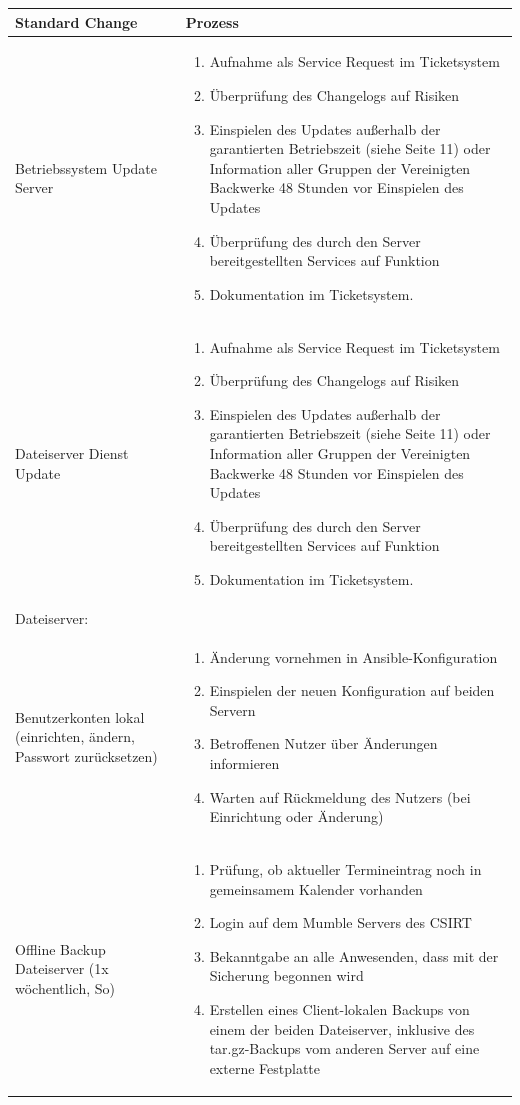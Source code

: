 \documentclass[]{article}
\begin{document}
\begin{longtable}{|p{3cm}|p{10cm}|}
\toprule
Standard Change & Prozess\tabularnewline
\midrule
Betriebssystem Update Server & \begin{enumerate}
\item
  Aufnahme als Service Request im Ticketsystem
\item
  Überprüfung des Changelogs auf Risiken
\item
  Einspielen des Updates außerhalb der garantierten Betriebszeit (siehe Seite
  11) oder Information aller Gruppen der Vereinigten Backwerke 48 Stunden vor
  Einspielen des Updates
\item
  Überprüfung des durch den Server bereitgestellten Services auf
  Funktion
\item
  Dokumentation im Ticketsystem.
\end{enumerate}\tabularnewline
\midrule

Dateiserver Dienst Update &
\begin{enumerate}
\item
  Aufnahme als Service Request im Ticketsystem
\item
  Überprüfung des Changelogs auf Risiken

\item
  Einspielen des Updates außerhalb der garantierten Betriebszeit (siehe Seite 11) oder Information aller Gruppen der Vereinigten Backwerke 48 Stunden vor Einspielen des Updates

\item
  Überprüfung des durch den Server bereitgestellten Services auf
  Funktion
\item
  Dokumentation im Ticketsystem.
\end{enumerate}\tabularnewline
Dateiserver:\\ Benutzerkonten lokal (einrichten, ändern, Passwort
zurücksetzen) & \begin{enumerate}
\item
  Änderung vornehmen in Ansible-Konfiguration
\item
  Einspielen der neuen Konfiguration auf beiden Servern
\item
  Betroffenen Nutzer über Änderungen informieren
\item
  Warten auf Rückmeldung des Nutzers (bei Einrichtung oder Änderung)
\end{enumerate}\tabularnewline
Offline Backup Dateiserver (1x wöchentlich, So) &
\begin{enumerate}
\item
  Prüfung, ob aktueller Termineintrag noch in gemeinsamem Kalender
  vorhanden
\item
  Login auf dem Mumble Servers des CSIRT
\item
  Bekanntgabe an alle Anwesenden, dass mit der Sicherung begonnen wird
\item
  Erstellen eines Client-lokalen Backups von einem der beiden
  Dateiserver, inklusive des tar.gz-Backups vom anderen Server auf eine
  externe Festplatte


\end{enumerate}
\end{longtable}
\end{document}
